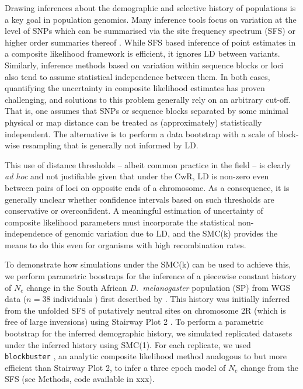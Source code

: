 \documentclass[9pt,twocolumn,twoside,lineno]{gsajnl}
\begin{document}
Drawing inferences about the demographic and selective history of populations is a key goal in population genomics. Many inference tools focus on variation at the level of SNPs which can be summarised via the site frequency spectrum (SFS) or higher order summaries thereof \citep{gutenkunst_inferring_2009, 
excoffier_fastsimcoal2_2021,
liu_stairway_2020, omarjee_blockbuster_2026}. While SFS based inference of point estimates in a composite likelihood framework is efficient, it ignores LD between variants. Similarly, inference methods based on variation within sequence blocks \citep{laetsch_demographically_2023} or loci also tend to assume statistical independence between them. In both cases, quantifying the uncertainty in composite likelihood estimates has proven challenging, and solutions to this problem generally rely on an arbitrary cut-off. That is, one assumes that SNPs or sequence blocks separated by some minimal physical or map distance can be treated as (approximately) statistically independent. The alternative is to perform a data bootstrap with a scale of block-wise resampling that is generally not informed by LD.

This use of distance thresholds -- albeit common practice in the field -- is clearly \emph{ad hoc} and not justifiable given that under the CwR, LD is non-zero even between pairs of loci on opposite ends of a chromosome. As a consequence, it is generally unclear whether confidence intervals based on such thresholds are conservative or overconfident. A meaningful estimation of uncertainty of composite likelihood parameters must incorporate the statistical non-independence of genomic variation due to LD, and the SMC(k) provides the means to do this even for organisms with high recombination rates. 

To demonstrate how simulations under the SMC(k) can be used to achieve this, we perform parametric boostraps for the inference of a piecewise constant history of $N_e$ change in the South African \textit{D.\ melanogaster} population (SP) from WGS data ($n =38$ individuals \citep{pool2012}) first described by \citet{chen_sub-saharan_2024}. This history was initially inferred from the unfolded SFS of putatively neutral sites on chromosome 2R (which is free of large inversions) using Stairway Plot 2 \citep{liu_stairway_2020}. To perform a parametric bootstrap for the inferred demographic history, we simulated replicated datasets under the inferred history using SMC(1). For each replicate, we used \texttt{blockbuster} \citep{omarjee_blockbuster_2026}, an analytic composite likelihood method analogous to but more efficient than Stairway Plot 2, to infer a three epoch model of $N_e$ change from the SFS (see Methods, code available in xxx).
\end{document}

